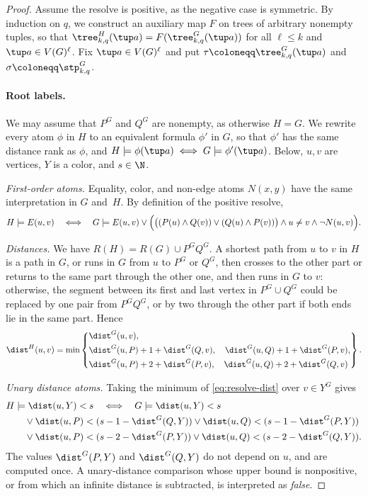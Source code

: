 \begin{proof}
Assume the resolve is positive, as the negative case is symmetric.
By induction on $q$,
we construct an auxiliary map $F$ on trees of arbitrary nonempty tuples, so that $\tree^{H}_{k,q}(\tup a)=F(\tree^G_{k,q}(\tup a))$ for all $\ell\le k$ and $\tup a\in V(G)^\ell$.
Fix $\tup a \in V(G)^\ell$ and
put $\tau\coloneqq\tree^G_{k,q}(\tup a)$ and $\sigma\coloneqq\stp^G_{k,q}$.

\paragraph{Root labels.}
We may assume that $P^G$ and $Q^G$ are nonempty, as otherwise $H=G$.
We rewrite every atom $\phi$ in $H$ to an equivalent formula $\phi'$ in $G$,
so that $\phi'$ has the same distance rank as $\phi$,
and $H\models\phi(\tup a)\iff G\models\phi'(\tup a)$.
Below, $u,v$ are vertices, $Y$ is a color, and $s\in\N$.

\emph{First-order atoms.}
Equality, color, and non-edge atoms $N(x,y)$ have the same interpretation in $G$ and~$H$.
By definition of the positive resolve,
\[
H\models E(u,v)
\quad\Longleftrightarrow\quad
G\models E(u,v)\lor\Bigl(\bigl((P(u)\land Q(v))\lor(Q(u)\land P(v))\bigr)\land u\ne v\land\lnot N(u,v)\Bigr).
\]

\emph{Distances.}
We have $R(H)=R(G)\cup P^GQ^G$.
A shortest path from $u$ to $v$ in $H$ is a path in $G$, or runs in $G$ from $u$ to $P^G$ or $Q^G$, then crosses to the other part or returns to the same part through the other one, and then runs in $G$ to $v$:
otherwise, the segment between its first and last vertex in $P^G\cup Q^G$ could be replaced by one pair from $P^GQ^G$, or by two through the other part if both ends lie in the same part.
Hence
\begin{equation}\label{eq:resolve-dist}
\dist^H(u,v)=\min\left\{
\begin{aligned}
&\dist^G(u,v),\\
&\dist^G(u,P)+1+\dist^G(Q,v),\quad \dist^G(u,Q)+1+\dist^G(P,v),\\
&\dist^G(u,P)+2+\dist^G(P,v),\quad \dist^G(u,Q)+2+\dist^G(Q,v)
\end{aligned}\right\}.
\end{equation}

\emph{Unary distance atoms.}
Taking the minimum of \eqref{eq:resolve-dist} over $v\in Y^G$ gives
\begin{align*}
&H\models\dist(u,Y)<s
\quad\Longleftrightarrow\quad
G\models\dist(u,Y)<s\\
&\qquad\lor\dist(u,P)<(s-1-\dist^G(Q,Y))\lor\dist(u,Q)<(s-1-\dist^G(P,Y))\\
&\qquad\lor\dist(u,P)<(s-2-\dist^G(P,Y))\lor\dist(u,Q)<(s-2-\dist^G(Q,Y)).
\end{align*}
The values $\dist^G(P,Y)$ and $\dist^G(Q,Y)$ do not depend on $u$, and are computed once. A unary-distance comparison whose upper bound is nonpositive, or from which an infinite distance is subtracted, is interpreted as \emph{false}.


\end{proof}
